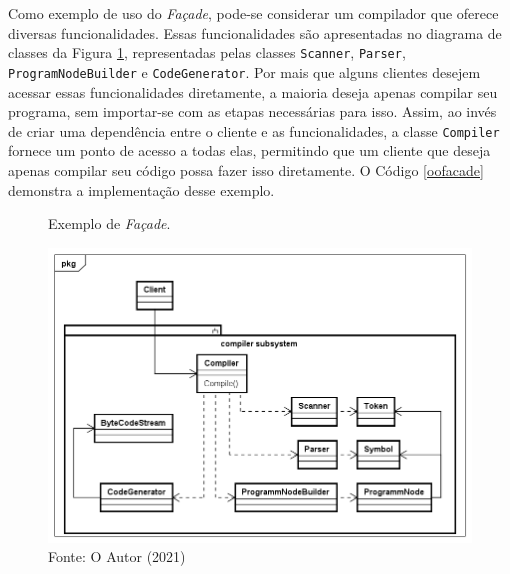 Como exemplo de uso do \textit{Façade}, pode-se considerar 
um compilador que oferece diversas funcionalidades. 
Essas funcionalidades são apresentadas no diagrama 
de classes da Figura \ref{facade_exemplo}, representadas 
pelas classes \texttt{Scanner}, \texttt{Parser}, \texttt{ProgramNodeBuilder} e 
\texttt{CodeGenerator}. Por mais que alguns clientes desejem 
acessar essas funcionalidades diretamente, a maioria 
deseja apenas compilar seu programa, sem importar-se 
com as etapas necessárias para isso. Assim, ao invés de 
criar uma dependência entre o cliente e as 
funcionalidades, a classe \texttt{Compiler} fornece um ponto 
de acesso a todas elas, permitindo que um cliente 
que deseja apenas compilar seu código possa fazer 
isso diretamente. O Código \ref{oofacade} demonstra 
a implementação desse exemplo.

\begin{figure}[htb]
	\caption{\label{facade_exemplo}Exemplo de \textit{Façade}.}
	\begin{center}
	    \includegraphics[scale=0.4]{5_padroes-contexto-funcional/5.2_estruturais/5.2.5_facade/facade_exemplo.png}
	\end{center}
  \caption*{Fonte: O Autor (2021)}
\end{figure}


